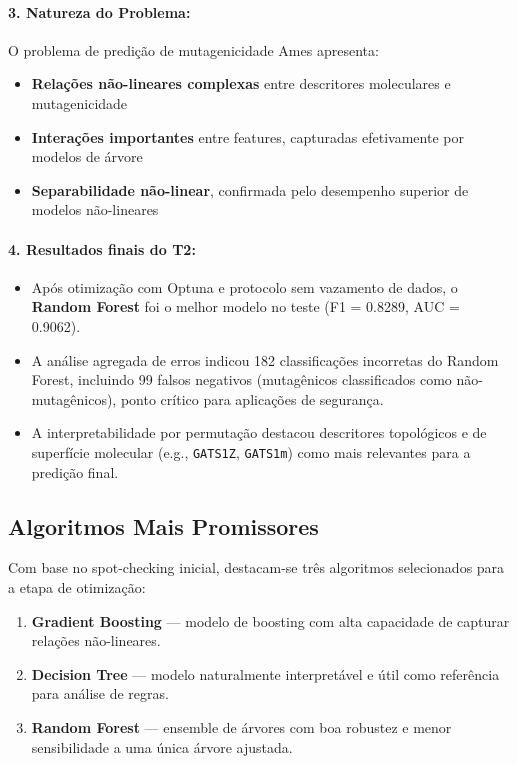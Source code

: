 \documentclass[12pt,a4paper]{article}
\begin{document}
\paragraph{3. Natureza do Problema:}

O problema de predição de mutagenicidade Ames apresenta:

\begin{itemize}
    \item \textbf{Relações não-lineares complexas} entre descritores moleculares e mutagenicidade
    \item \textbf{Interações importantes} entre features, capturadas efetivamente por modelos de árvore
    \item \textbf{Separabilidade não-linear}, confirmada pelo desempenho superior de modelos não-lineares
\end{itemize}

\paragraph{4. Resultados finais do T2:}

\begin{itemize}
    \item Após otimização com Optuna e protocolo sem vazamento de dados, o \textbf{Random Forest} foi o melhor modelo no teste (F1 = 0.8289, AUC = 0.9062).
    \item A análise agregada de erros indicou 182 classificações incorretas do Random Forest, incluindo 99 falsos negativos (mutagênicos classificados como não-mutagênicos), ponto crítico para aplicações de segurança.
    \item A interpretabilidade por permutação destacou descritores topológicos e de superfície molecular (e.g., \texttt{GATS1Z}, \texttt{GATS1m}) como mais relevantes para a predição final.
\end{itemize}

\subsection{Algoritmos Mais Promissores}

Com base no spot-checking inicial, destacam-se três algoritmos selecionados para a etapa de otimização:

\begin{enumerate}
    \item \textbf{Gradient Boosting} --- modelo de boosting com alta capacidade de capturar relações não-lineares.
    \item \textbf{Decision Tree} --- modelo naturalmente interpretável e útil como referência para análise de regras.
    \item \textbf{Random Forest} --- ensemble de árvores com boa robustez e menor sensibilidade a uma única árvore ajustada.
\end{enumerate}
\end{document}
